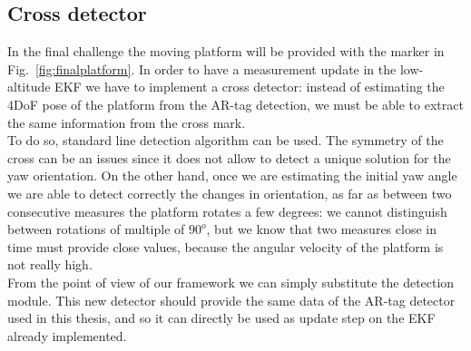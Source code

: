 \subsection{Cross detector}
In the final challenge the moving platform will be provided with the marker in Fig.~\ref{fig:finalplatform}. In order to have a measurement update in the low-altitude EKF we have to implement a cross detector: instead of estimating the 4DoF pose of the platform from the AR-tag detection, we must be able to extract the same information from the cross mark.\\

To do so, standard line detection algorithm can be used. The symmetry of the cross can be an issues since it does not allow to detect a unique solution for the yaw orientation. On the other hand, once we are estimating the initial yaw angle we are able to detect correctly the changes in orientation, as far as between two consecutive measures the platform rotates a few degrees: we cannot distinguish between rotations of multiple of $90^o$, but we know that two measures close in time must provide close values, because the angular velocity of the platform is not really high.\\

From the point of view of our framework we can simply substitute the detection module. This new detector should provide the same data of the AR-tag detector used in this thesis, and so it can directly be used as update step on the EKF already implemented.\\
